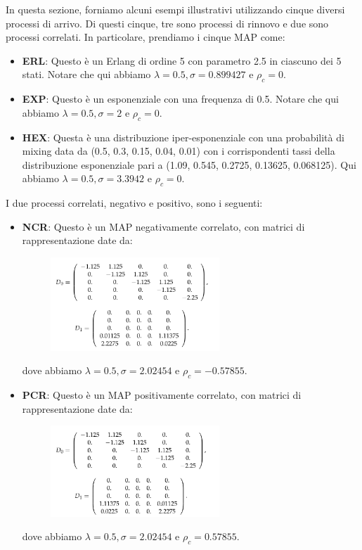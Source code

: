 \documentclass[11pt]{article}
\begin{document}
In questa sezione, forniamo alcuni esempi illustrativi utilizzando cinque diversi processi di arrivo. Di questi cinque, tre sono processi di rinnovo e due sono processi correlati. In particolare, prendiamo i cinque MAP come:
\begin{itemize}
    \item \textbf{ERL}: Questo è un Erlang di ordine 5 con parametro 2.5 in ciascuno dei 5 stati. Notare che qui abbiamo $\lambda = 0.5, \sigma = 0.899427$ e $\rho_c = 0$.
    \item \textbf{EXP}: Questo è un esponenziale con una frequenza di 0.5. Notare che qui abbiamo $\lambda = 0.5, \sigma = 2$ e $\rho_c = 0$.
    \item \textbf{HEX}: Questa è una distribuzione iper-esponenziale con una probabilità di mixing data da (0.5, 0.3, 0.15, 0.04, 0.01) con i corrispondenti tassi della distribuzione esponenziale pari a (1.09, 0.545, 0.2725, 0.13625, 0.068125). Qui abbiamo $\lambda = 0.5, \sigma = 3.3942$ e $\rho_c = 0$.
\end{itemize}
I due processi correlati, negativo e positivo, sono i seguenti:
\begin{itemize}
    \item \textbf{NCR}: Questo è un MAP negativamente correlato, con matrici di rappresentazione date da:
    \begin{figure}[h!]
        \centering
        \includegraphics[width=0.6\textwidth]{GYJt39w.png}
        \label{fig:NCR}
    \end{figure}
    dove abbiamo $\lambda = 0.5, \sigma = 2.02454$ e $\rho_c =  -0.57855$.
    \item \textbf{PCR}: Questo è un MAP positivamente correlato, con matrici di rappresentazione date da:
    \begin{figure}
        \centering
        \includegraphics[width=0.6\textwidth]{GFF6s3y.png}
        \label{fig:PCR}
    \end{figure}
    dove abbiamo $\lambda = 0.5, \sigma = 2.02454$ e $\rho_c = 0.57855$.
\end{itemize}
\end{document}
